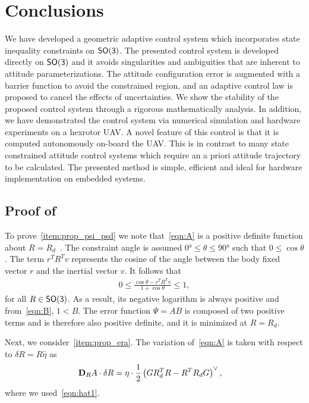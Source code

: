 \documentclass[letterpaper, 10 pt, conference]{ieeeconf}  %
\begin{document}
\section{Conclusions}\label{sec:conclusions}
We have developed a geometric adaptive control system which incorporates state inequality constraints on \(\mathsf{SO(3)}\).
The presented control system is developed directly on \(\mathsf{SO(3)}\) and it avoids singularities and ambiguities that are inherent to attitude parameterizations.
The attitude configuration error is augmented with a barrier function to avoid the constrained region, and an adaptive control law is proposed to cancel the effects of uncertainties. 
We show the stability of the  proposed control system through a rigorous mathematically analysis.
In addition, we have demonstrated the control system via numerical simulation and hardware experiments on a hexrotor UAV.
A novel feature of this control is that it is computed autonomously on-board the UAV.
This is in contrast to many state constrained attitude control systems which require an a priori attitude trajectory to be calculated. 
The presented method is simple, efficient and ideal for hardware implementation on embedded systems.



\appendix
\subsection{Proof of~}\label{proof:config_error}
To prove~\cref{item:prop_psi_psd} we note that~\cref{eqn:A} is a positive definite function about \( R = R_d \)~\cite{bullo2004}.
The constraint angle is assumed \( \ang{0} \leq \theta \leq \ang{90} \) such that \( 0 \leq \cos \theta \).
The term \( r^T R^T v \) represents the cosine of the angle between the body fixed vector \( r \) and the inertial vector \( v \). 
It follows that
\begin{align*}
	0 \leq  \frac{\cos \theta -  r^T R^T v}{1 + \cos \theta} \leq 1 ,
\end{align*}
for all \( R \in \mathsf{SO(3)} \). 
As a result, its negative logarithm is always positive and from~\cref{eqn:B}, \(1 < B\).
The error function \( \Psi = A B \) is composed of two positive terms and is therefore also positive definite, and it is minimized at \( R = R_d \).

Next, we consider~\cref{item:prop_era}.
The variation of~\cref{eqn:A} is taken with respect to \( \delta R = R \hat \eta \) as
\begin{align*}
	\mathbf{D}_{R} A \cdot \delta R &= \eta \cdot \frac{1}{2} \left( G R_d^T R - R^T R_d G\right)^\vee ,
\end{align*}
where we used~\cref{eqn:hat1}.
\end{document}
